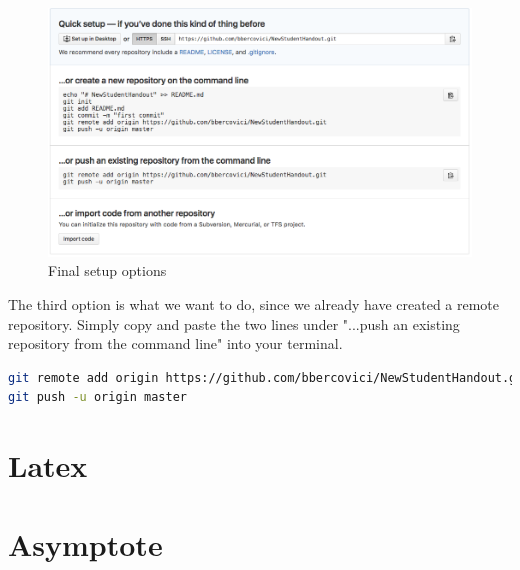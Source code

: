 \documentclass{report}
\begin{document}
\begin{figure}[H]
\centering
\includegraphics[scale=0.4]{setup_options}
\caption{Final setup options}
\label{fig:setup_options}
\end{figure}
The third option is what we want to do, since we already have created a remote repository. Simply copy and paste the two lines under "...push an existing repository from the command line" into your terminal. 
\begin{lstlisting}[language=bash, caption=Push the local repository to the remote ]
git remote add origin https://github.com/bbercovici/NewStudentHandout.git
git push -u origin master
\end{lstlisting}

\section{Latex}
\section{Asymptote}
\end{document}
